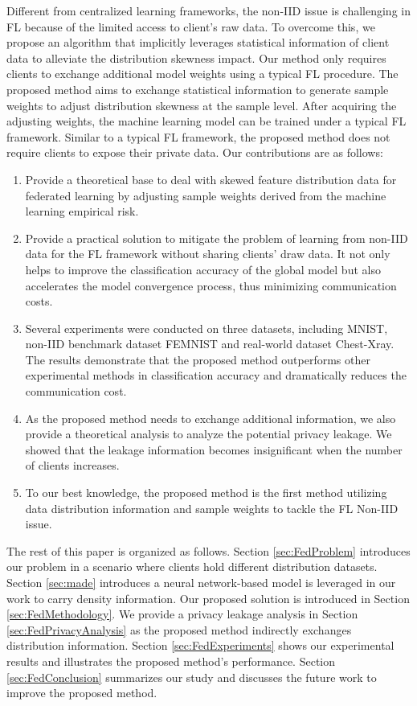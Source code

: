 Different from centralized learning frameworks, the non-IID issue is challenging in FL because of the limited access to client's raw data. To overcome this, we propose an algorithm that implicitly leverages statistical information of client data to alleviate the distribution skewness impact. Our method only requires clients to exchange additional model weights using a typical FL procedure. The proposed method aims to exchange statistical information to generate sample weights to adjust distribution skewness at the sample level. After acquiring the adjusting weights, the machine learning model can be trained under a typical FL framework. Similar to a typical FL framework, the proposed method does not require clients to expose their private data.
Our contributions are as follows:
\begin{enumerate}
	\item Provide a theoretical base to deal with skewed feature distribution data for federated learning by adjusting sample weights derived from the machine learning empirical risk.  
	\item Provide a practical solution to mitigate the problem of learning from non-IID data for the FL framework without sharing clients' draw data. It not only helps to improve the classification accuracy of the global model but also accelerates the model convergence process, thus minimizing communication costs.
	\item Several experiments were conducted on three datasets, including MNIST, non-IID benchmark dataset FEMNIST and real-world dataset Chest-Xray. The results demonstrate that the proposed method outperforms other experimental methods in classification accuracy and dramatically reduces the communication cost.
	\item As the proposed method needs to exchange additional information, we also provide a theoretical analysis to analyze the potential privacy leakage. We showed that the leakage information becomes insignificant when the number of clients increases. 
	\item To our best knowledge, the proposed method is the first method utilizing data distribution information and sample weights to tackle the FL Non-IID issue.   
\end{enumerate}

The rest of this paper is organized as follows. Section \ref{sec:FedProblem} introduces our problem in a scenario where clients hold different distribution datasets. Section \ref{sec:made} introduces a neural network-based model is leveraged in our work to carry density information. Our proposed solution is introduced in Section \ref{sec:FedMethodology}. We provide a privacy leakage analysis in Section \ref{sec:FedPrivacyAnalysis} as the proposed method indirectly exchanges distribution information. Section \ref{sec:FedExperiments} shows our experimental results and illustrates the proposed method's performance. Section \ref{sec:FedConclusion} summarizes our study and discusses the future work to improve the proposed method.        

